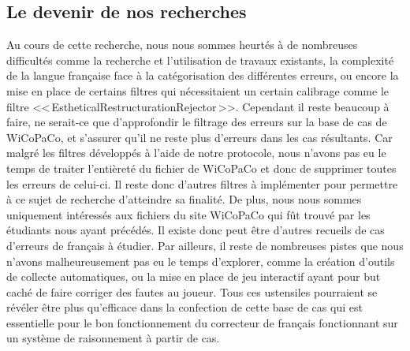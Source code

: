 \documentclass[11pt]{article}
\begin{document}
\subsection{Le devenir de nos recherches}
Au cours de cette recherche, nous nous sommes heurt\'{e}s \`{a} de nombreuses difficult\'{e}s comme la recherche et l'utilisation de travaux existants, la complexit\'{e} de la langue fran\c{c}aise face \`{a} la cat\'{e}gorisation des diff\'{e}rentes erreurs, ou encore la mise en place de certains filtres qui n\'{e}cessitaient un certain calibrage comme le filtre <<\,EstheticalRestructurationRejector\,>>.
\newline
\newline
Cependant il reste beaucoup \`{a} faire, ne serait-ce que d'approfondir le filtrage des erreurs sur la base de cas de WiCoPaCo, et s'assurer qu'il ne reste plus d'erreurs dans les cas r\'{e}sultants. Car malgr\'{e} les filtres d\'{e}velopp\'{e}s \`{a} l'aide de notre protocole, nous n'avons pas eu le temps de traiter l'enti\`{e}ret\'{e} du fichier de WiCoPaCo et donc de supprimer toutes les erreurs de celui-ci. Il reste donc d'autres filtres \`{a} impl\'{e}menter pour permettre \`{a} ce sujet de recherche d'atteindre sa finalit\'{e}. De plus, nous nous sommes uniquement int\'{e}ress\'{e}s aux fichiers du site WiCoPaCo qui f\^{u}t trouv\'{e} par les \'{e}tudiants nous ayant pr\'{e}c\'{e}d\'{e}s. Il existe donc peut \^{e}tre d'autres recueils de cas d'erreurs de fran\c{c}ais \`{a} \'{e}tudier. 
\newline
\newline
Par ailleurs, il reste de nombreuses pistes que nous n'avons malheureusement pas eu le temps d'explorer, comme la cr\'{e}ation d'outils de collecte automatiques, ou la mise en place de jeu interactif ayant pour but cach\'{e} de faire corriger des fautes au joueur. 
\newline
\newline
Tous ces ustensiles pourraient se r\'{e}v\'{e}ler \^{e}tre plus qu'efficace dans la confection de cette base de cas qui est essentielle pour le bon fonctionnement du correcteur de fran\c{c}ais fonctionnant sur un syst\`{e}me de raisonnement \`{a} partir de cas.  
\end{document}
